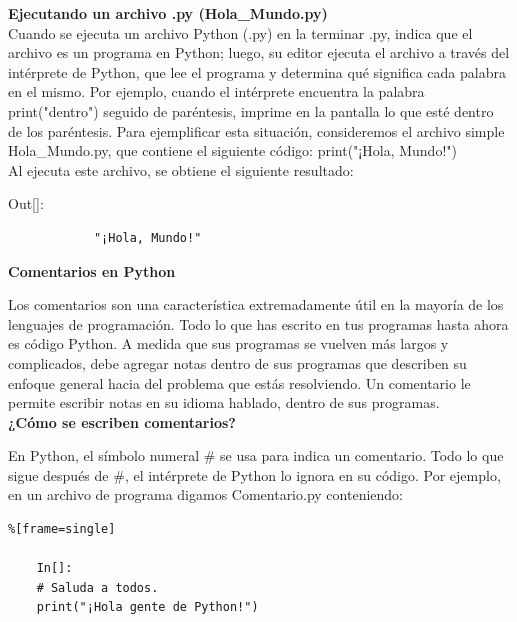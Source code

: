 {\bf{Ejecutando un archivo .py (Hola\_Mundo.py)}}\\

Cuando se ejecuta un archivo Python (.py) en la terminar  .py,  indica que el archivo es un programa en Python; luego, su editor ejecuta el archivo a través del intérprete de  Python, que lee el programa y determina qué significa cada palabra en el mismo. Por ejemplo, cuando el intérprete encuentra la palabra   {\ttfamily print("dentro")} seguido de paréntesis, imprime en la pantalla lo que esté dentro de los paréntesis.   Para ejemplificar esta situación,  consideremos el archivo simple  {\ttfamily  Hola\_Mundo.py}, que  contiene el siguiente código: 
{\ttfamily print("¡Hola, Mundo!")}\\

Al  ejecuta este archivo, se obtiene el siguiente  resultado:\\


{\ttfamily\scriptsize\scriptsize 
	\hspace{-0.65cm}Out[]:\vspace{-0.15cm}	
	{\color{blue} 	
		\begin{verbatim}
			"¡Hola, Mundo!"
		\end{verbatim}
}}



{\bf{Comentarios en Python}}\\

Los comentarios son una característica extremadamente útil en la mayoría de los lenguajes de programación.
Todo lo que has escrito en tus programas hasta ahora es código Python.
A medida que sus programas se vuelven más largos y complicados, debe agregar
notas dentro de sus programas que describen su enfoque general hacia del
problema que estás resolviendo. Un comentario le permite escribir notas en su idioma hablado,  dentro de sus programas.\\

{\bf ¿Cómo se escriben comentarios? }\\

En Python, el símbolo numeral  {\ttfamily \#}  se usa para indica un comentario. Todo lo que sigue después de {\ttfamily \#}, el intérprete de Python lo ignora en su código. Por ejemplo, en un archivo de programa digamos {\ttfamily Comentario.py}  conteniendo: 

\begin{lstlisting}%[frame=single]
	
	In[]:
	# Saluda a todos.
	print("¡Hola gente de Python!")
	
\end{lstlisting}

